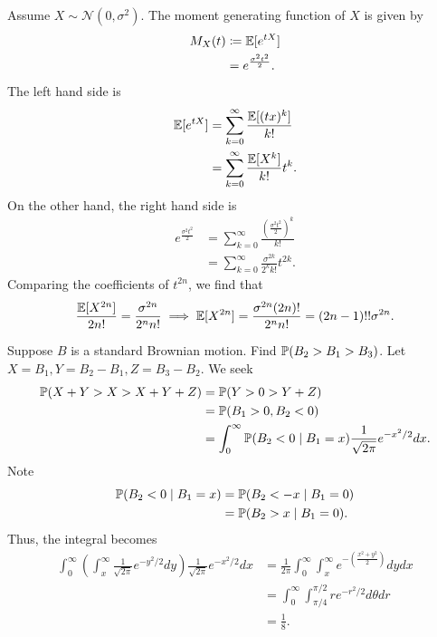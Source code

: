 \documentclass[11pt]{article}
\begin{document}
Assume $X \sim \mathcal{N}(0, \sigma^2)$. The moment generating function of $X$ is given by \begin{align*} M_X(t) & \coloneqq \mathbb{E} [ e^{tX}] \\ & = e^{\frac{\sigma^2 t^2}{2}}.
\end{align*} The left hand side is \begin{align*} \mathbb{E} [e^{tX}] & = \sum_{k = 0}^{\infty} \frac{\mathbb{E} [(tx)^k]}{k!} \\ & = \sum_{k = 0}^{\infty} \frac{\mathbb{E} [X^k]}{k!} t^k.
\end{align*} On the other hand, the right hand side is \begin{align*} e^{\frac{\sigma^2 t^2}{2}} & = \sum_{k = 0}^{\infty} \frac{\left( \frac{\sigma^2 t^2}{2} \right)^k}{k!} \\ & = \sum_{k = 0}^{\infty} \frac{\sigma^{2k}}{2^kk!} t^{2k}.
\end{align*} Comparing the coefficients of $t^{2n}$, we find that \begin{align*} \frac{\mathbb{E}[X^{2n}]}{2n!} = \frac{\sigma^{2n}}{2^nn!} \implies \mathbb{E} [X^{2n}] = \frac{\sigma^{2n}(2n)!}{2^n n!} = (2n-1)!! \sigma^{2n}.
\end{align*}

\begin{example} Suppose $B$ is a standard Brownian motion. Find $\mathbb{P} (B_2 > B_1 > B_3)$. Let $X = B_1, Y = B_2 - B_1, Z = B_3 - B_2$. We seek \begin{align*} \mathbb{P} (X + Y > X > X + Y + Z) & = \mathbb{P} (Y > 0 > Y + Z) \\ & = \mathbb{P} (B_1 > 0, B_2 < 0) \\ & = \int_0^{\infty} \mathbb{P} (B_2 < 0 \mid B_1 = x) \frac{1}{\sqrt{2 \pi}} e^{-x^2/2} dx.
\end{align*} Note \begin{align*} \mathbb{P} (B_2 < 0 \mid B_1 = x) & = \mathbb{P} (B_2 < -x \mid B_1 = 0) \\ & = \mathbb{P} (B_2 > x \mid B_1 = 0).
\end{align*} Thus, the integral becomes \begin{align*} \int_0^{\infty} \left( \int_x^{\infty} \frac{1}{\sqrt{2\pi}} e^{-y^2/2} dy \right) \frac{1}{\sqrt{2\pi}} e^{-x^2/2} dx &  = \frac{1}{2\pi} \int_0^{\infty} \int_x^{\infty} e^{- \left( \frac{x^2 + y^2}{2} \right)} dy dx \\ & = \int_0^{\infty} \int_{\pi / 4}^{\pi / 2} re^{-r^2 /2} d \theta d r \\ & = \frac{1}{8}.
\end{align*}
\end{example}
\end{document}

